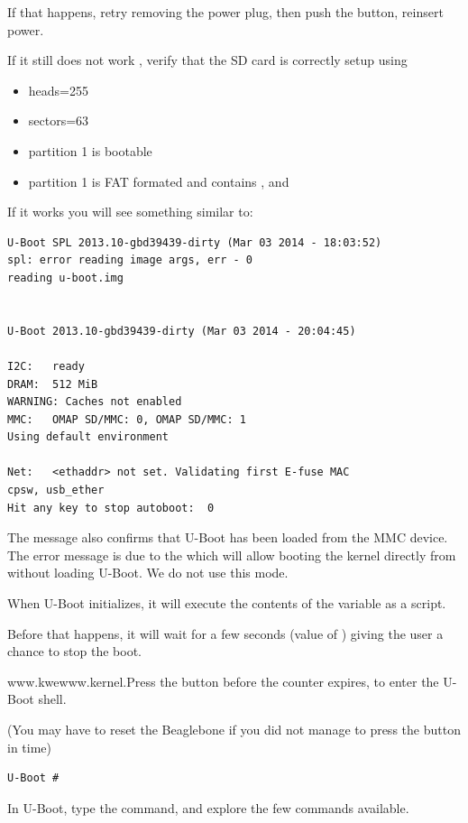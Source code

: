 If that happens, retry removing the power plug, then push the button, reinsert power.

If it still does not work , verify that the SD card is correctly setup using  

\begin{itemize}
\item heads=255
\item sectors=63
\item partition 1 is bootable
\item partition 1 is FAT formated and contains ,  and 
\end{itemize}


\clearpage

If it works you will see something similar to:

\begin{verbatim}
U-Boot SPL 2013.10-gbd39439-dirty (Mar 03 2014 - 18:03:52)
spl: error reading image args, err - 0
reading u-boot.img


U-Boot 2013.10-gbd39439-dirty (Mar 03 2014 - 20:04:45)

I2C:   ready
DRAM:  512 MiB
WARNING: Caches not enabled
MMC:   OMAP SD/MMC: 0, OMAP SD/MMC: 1
Using default environment

Net:   <ethaddr> not set. Validating first E-fuse MAC
cpsw, usb_ether
Hit any key to stop autoboot:  0 
\end{verbatim}

The message  also confirms that U-Boot has
been loaded from the MMC device. The error message is due to the  which
will allow booting the kernel directly from  without loading U-Boot. We do not use this mode.

When U-Boot initializes, it will execute the contents of the  variable as a script.

Before that happens, it will wait for a few seconds (value of ) giving
the user a chance to stop the boot. 

www.kwewww.kernel.Press the  button before the counter expires, to enter the U-Boot shell.

 (You may have to reset the Beaglebone if you
did not manage to press the  button in time)
\begin{verbatim}
U-Boot #
\end{verbatim}

In U-Boot, type the  command, and explore the few commands available.

